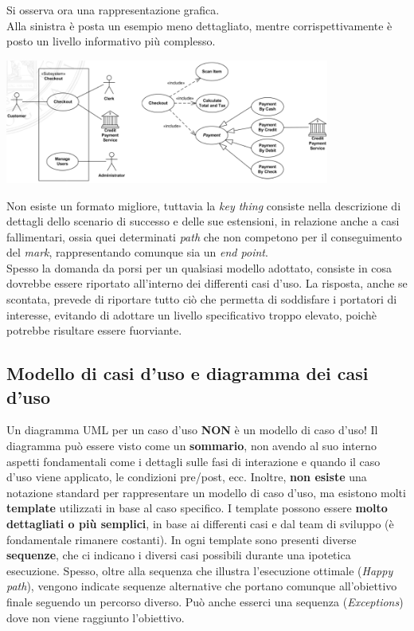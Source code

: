 \documentclass{article}
\begin{document}
Si osserva ora una rappresentazione grafica.\\ Alla sinistra è posta un esempio meno dettagliato, mentre corrispettivamente è posto un livello informativo più complesso.\vspace*{14pt}
\begin{center}
    \includegraphics[width=0.8\textwidth]{foto 1.png}
\end{center}
\pagebreak
Non esiste un formato migliore, tuttavia la \textit{key thing} consiste nella descrizione di dettagli dello scenario di successo e delle sue estensioni, in relazione anche a casi fallimentari,  ossia quei determinati \textit{path} che non competono per il conseguimento del \textit{mark}, rappresentando comunque sia un \textit{end point}.\\
Spesso la domanda da porsi per un qualsiasi modello adottato, consiste in cosa dovrebbe essere riportato all'interno dei differenti casi d'uso. La risposta, anche se scontata, prevede di riportare tutto ciò che permetta di soddisfare i portatori di interesse, evitando di adottare un livello specificativo troppo elevato, poichè potrebbe risultare essere fuorviante.

\subsection*{Modello di casi d'uso e diagramma dei casi d'uso}
\large
Un diagramma UML per un caso d'uso \textbf{NON} è un modello di caso d'uso! Il diagramma può essere visto come un \textbf{sommario}, non avendo al suo interno aspetti fondamentali come i dettagli sulle fasi di interazione e quando il caso d'uso viene applicato, le condizioni pre/post, ecc. Inoltre, \textbf{non esiste} una notazione standard per rappresentare un modello di caso d'uso, ma esistono molti \textbf{template} utilizzati in base al caso specifico. I template possono essere \textbf{molto dettagliati o più semplici}, in base ai differenti casi e dal team di sviluppo (è fondamentale rimanere costanti). In ogni template sono presenti diverse \textbf{sequenze}, che ci indicano i diversi casi possibili durante una ipotetica esecuzione. Spesso, oltre alla sequenza che illustra l'esecuzione ottimale (\textit{Happy path}), vengono indicate sequenze alternative che portano comunque all'obiettivo finale seguendo un percorso diverso. Può anche esserci una sequenza (\textit{Exceptions}) dove non viene raggiunto l'obiettivo.
\end{document}
